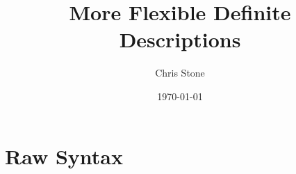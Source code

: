 \documentclass[10pt,letter]{article}
\begin{document}
\title{More Flexible Definite Descriptions}
\author{Chris Stone}
\date{\today}
\maketitle


\section{Raw Syntax}

\newcommand{\I}{I}

\renewcommand{\t}{t}
\renewcommand{\u}{u}
\newcommand{\f}{f}
\newcommand{\x}{x}
\newcommand{\y}{y}
\newcommand{\tFun}[3]{#1({#2}_1,\ldots,{#2}_{#3})}
\newcommand{\tDesc}[3]{\rotatebox[origin=c]{180}{$\iota$} #1.\, #3}


\newcommand{\p}{P}
\newcommand{\q}{Q}
\renewcommand{\r}{R}

\newcommand{\pTrue}{\top}
\newcommand{\pFalse}{\bot}
\newcommand{\pExists}[3]{\exists #1.\, #3}
\newcommand{\pForall}[3]{\forall #1.\, #3}
\newcommand{\pAnd}[2]{#1 \wedge #2}
\newcommand{\pOr}[2]{#1 \vee #2}
\newcommand{\pImply}[2]{#1 \Rightarrow #2}
\newcommand{\pEqual}[2]{#1 = #2}
\newcommand{\pIff}[2]{#1 \Longleftrightarrow #2}

\newcommand{\D}{\Delta}
\newcommand{\emptyCtx}{\cdot}

\renewcommand{\wp}[1]{\mathop{\mathsf{WP}}(#1)}
\newcommand{\jwp}[1]{\mathop{\mathsf{wp}}(#1)}
\newcommand{\trans}[1]{\ulcorner #1 \urcorner}
\newcommand{\jtrans}[1]{\llcorner #1 \lrcorner}

\newcommand{\jwfterm}[3]{#1 \vdash #2\, :\, #3}
\newcommand{\jwfprop}[2]{#1 \vdash #2\, :\, \mathsf{Prop}}
\newcommand{\jpf}[2]{#1 \vdash #2}

\newcommand{\wfterm}[3]{#1 \,\triangleright\, #2\, :\, #3}
\newcommand{\wfprop}[2]{#1 \,\triangleright\, #2\,:\, \mathsf{Prop}}
\newcommand{\pf}[2]{#1 \,\triangleright\, #2}

\newcommand{\subst}[3]{#1[#2{\mapsto}#3]}
\end{document}

